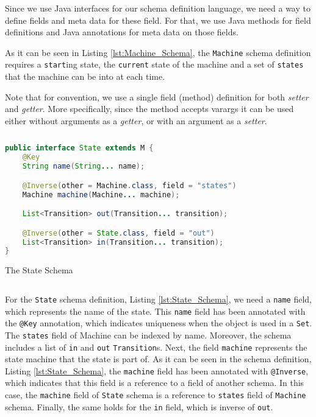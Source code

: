 Since we use Java interfaces for our schema definition language, we need a way to define fields and meta data for these field.
For that, we use Java methods for field definitions and Java annotations for meta data on those fields.

As it can be seen in Listing \ref{lst:Machine_Schema}, the \texttt{Machine} schema definition requires a \texttt{start}ing state, the \texttt{current} state of the machine and a set of \texttt{states} that the machine can be into at each time.

Note that for convention, we use a single field (method) definition for both \textit{setter} and \textit{getter}.
More specifically, since the method accepts varargs it can be used either without arguments as a \textit{getter}, or with an argument as a \textit{setter}.

\begin{sourcecode}[H]
	\begin{lstlisting}[language=Java,escapechar=|]
public interface State extends M {
	@Key
	String name(String... name);

	@Inverse(other = Machine.class, field = "states")
	Machine machine(Machine... machine);

	List<Transition> out(Transition... transition);

	@Inverse(other = State.class, field = "out")
	List<Transition> in(Transition... transition);
}
	\end{lstlisting}
	\caption{The State Schema}
	\label{lst:State_Schema}
\end{sourcecode}

For the \texttt{State} schema definition, Listing \ref{lst:State_Schema}, we need a \texttt{name} field, which represents the name of the state. 
This \texttt{name} field has been annotated with the \texttt{@Key} annotation, which indicates uniqueness when the object is used in a \texttt{Set}. 
The \texttt{states} field of Machine can be indexed by name.
Moreover, the schema includes a list of \texttt{in} and \texttt{out} \texttt{Transition}s.
Next, the field \texttt{machine} represents the state machine that the state is part of. 
As it can be seen in the schema definition, Listing \ref{lst:State_Schema}, the \texttt{machine} field has been annotated with \texttt{@Inverse}, which indicates that this field is a reference to a field of another schema.
In this case, the \texttt{machine} field of \texttt{State} schema is a reference to \texttt{states} field of \texttt{Machine} schema.
Finally, the same holds for the \texttt{in} field, which is inverse of \texttt{out}.

